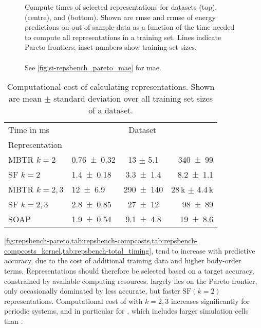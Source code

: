\begin{figure}
  \centering



  \caption{Compute times of selected representations for datasets \dsgdb{} (top), \dsba{} (centre), and \dstcor{} (bottom).
  Shown are \gls{rmse} and \gls{rrmse} of energy predictions on out-of-sample-data as a function of the time needed to compute all representations in a training set.
  Lines indicate Pareto frontiers; inset numbers show training set sizes.
  \\\\
  See \cref{fig:si-repsbench_pareto_mae} for \gls{mae}.
	}
	\label{fig:repsbench-pareto}
\end{figure}


\begin{table}
	\caption{Computational cost of calculating representations.
		Shown are mean $\pm$ standard deviation over all training set sizes of a dataset.
		}
		\label{tab:repsbench-compcosts}

	\begin{tabular}[b]{@{}llcr@{}}
		\toprule
		Time in ms& \multicolumn{3}{c}{Dataset} \\ \cmidrule(lr){2-4}
		Representation & \multicolumn{1}{c}{\dsgdb} & \multicolumn{1}{c}{\dsba} & \multicolumn{1}{c}{\dstco} \\
		\midrule
		MBTR $k{=}2$   & \num{0.76\pm 0.32 } &     {13 $\pm$ 5.1} & \num{340 \pm 99 } \\
		SF $k{=}2$     & \num{1.4 \pm 0.18 } & \num{3.3 \pm 1.4 } & \num{8.2 \pm 1.1 } \\
		MBTR $k{=}2,3$ & \num{12  \pm 6.9  } & \num{290 \pm 140 } & 28\,k $\pm$ 4.4\,k \\
		SF $k{=}2,3$   & \num{2.8 \pm 0.85 } & \num{27  \pm 12  } & \num{98 \pm 89 } \\
		SOAP         & \num{1.9 \pm 0.54 } & \num{9.1 \pm 4.8 } & \num{19 \pm 8.6 } \\
		\bottomrule
	\end{tabular}
\end{table}


 \cref{fig:repsbench-pareto,tab:repsbench-compcosts,tab:repsbench-compcosts_kernel,tab:repsbench-total_timing}, tend to increase with predictive accuracy, due to the cost of additional training data and higher body-order terms.
Representations should therefore be selected based on a target accuracy, constrained by available computing resources.
\soap largely lies on the Pareto frontier, only occasionally dominated by less accurate, but faster $\text{SF}(k{=}2)$ representations.
Computational cost of \mbtr with $k{=}2,3$ increases significantly for periodic systems, and in particular for \dstco, which includes larger simulation cells than \dsba.


